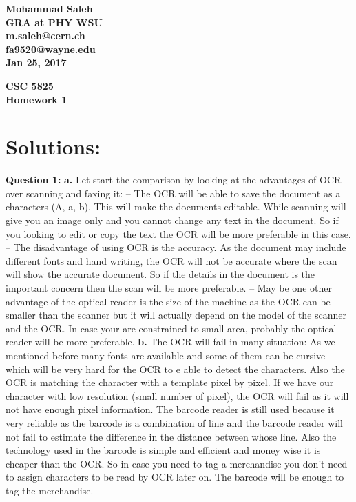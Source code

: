 \documentclass{article}
\begin{document}
\begin{flushright}
\textbf{Mohammad Saleh\\
GRA at PHY WSU\\
m.saleh@cern.ch\\ fa9520@wayne.edu\\
Jan 25, 2017}
\end{flushright}

\begin{center}
\textbf{CSC 5825 \\
Homework 1 } \\
\end{center}

\section*{Solutions:}
\textbf{Question 1:}
\newline
\textbf{a.} Let start the comparison by looking at the advantages of OCR over scanning and faxing it:
-- The OCR will be able to save the document as a characters (A, a, b). This will make the documents editable. While scanning will give you an image only and you cannot change any text in the document.
 So if you looking to edit or copy the text the OCR will be more preferable in this case.\newline
-- The disadvantage of using OCR is the accuracy. As the document may include different fonts and hand writing, the OCR will not be accurate where the scan will show the accurate document. So if the details in the document is the important concern then the scan will be more preferable.\newline
-- May be one other advantage of the optical reader is the size of the machine as the OCR can be smaller than the scanner but it will actually depend on the model of the scanner and the OCR. In case your are constrained to small area, probably the optical reader will be more preferable.
\newline
\newline
\textbf{b.} The OCR will fail in many situation: As we mentioned before many fonts are available and some of them can be cursive which will be very hard for the OCR to e able to detect the characters. Also the OCR is matching the character with a template pixel by pixel. If we have our character with low resolution (small number of pixel), the OCR will fail as it will not have enough pixel information.
\newline
The barcode reader is still used because it very reliable as the barcode is a combination of line and the barcode reader will not fail to estimate the difference in the distance between whose line. Also the technology used in the barcode is simple and efficient and money wise it is cheaper than the OCR. So in case you need to tag a merchandise you don't need to assign characters to be read by OCR later on. The barcode will be enough to tag the merchandise.
\end{document}
